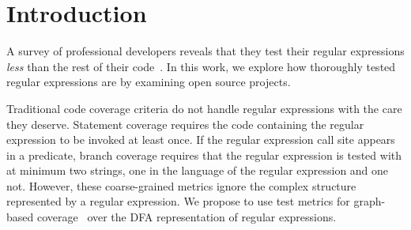 \section{Introduction}
\label{sec:intro}





A survey of professional developers reveals that they test their regular expressions {\em less} than the rest of their code~\cite{chapman2016}.  In this work, we explore how thoroughly tested regular expressions are by examining open source projects. 

Traditional code coverage criteria do not handle regular expressions with the care they deserve. 
Statement coverage requires the code containing the regular expression to be invoked at least once. 
If the regular expression call site appears in a predicate, branch coverage requires that the regular expression is tested with at minimum two strings, one in the language of the regular expression and one not. 
However, these coarse-grained metrics ignore the complex structure represented by a regular expression.
We propose to use test metrics for graph-based coverage~\cite{ammann2016introduction} over the DFA representation of regular expressions. %


